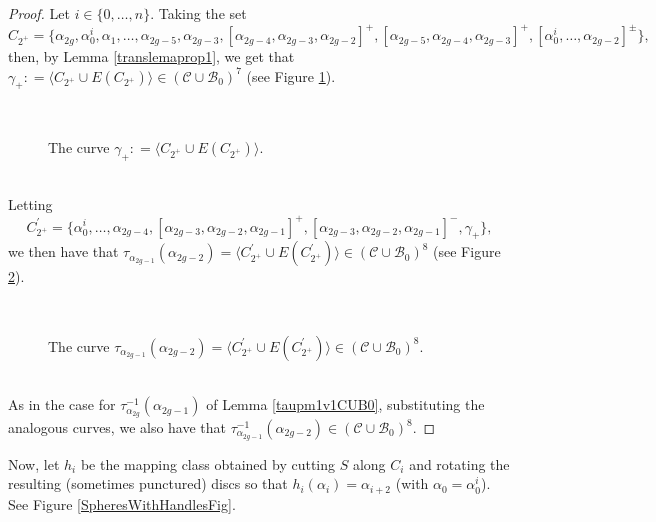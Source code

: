 \documentclass[twoside,11pt,a4paper]{article}
\newcommand*{\Cf}{\mathscr{C}}
\newcommand*{\Bf}{\mathscr{B}}
\newcommand*{\ColonEqq}{\mathrel{\mathop:}=}
\begin{document}
\begin{proof}
 \indent Let $i \in \{0, \ldots, n\}$. Taking the set $$C_{2^{+}} = \{\alpha_{2g}, \alpha_{0}^{i}, \alpha_{1}, \ldots, \alpha_{2g-5}, \alpha_{2g-3}, [\alpha_{2g-4}, \alpha_{2g-3}, \alpha_{2g-2}]^{+}, [\alpha_{2g-5},\alpha_{2g-4},\alpha_{2g-3}]^{+}, [\alpha_{0}^{i}, \ldots, \alpha_{2g-2}]^{\pm}\},$$
 then, by Lemma \ref{translemaprop1}, we get that $\gamma_{+} \ColonEqq \langle C_{2^{+}} \cup E(C_{2^{+}})\rangle \in (\Cf \cup \Bf_{0})^{7}$ (see Figure \ref{DefGammaplusBeforeRem2-11fig1}).
 \begin{figure}[h]
 \begin{center}
  \resizebox{10cm}{!}{}\\[0.3cm]
  \resizebox{10cm}{!}{} \caption{The curve $\gamma_{+} \ColonEqq \langle C_{2^{+}} \cup E(C_{2^{+}})\rangle $.} \label{DefGammaplusBeforeRem2-11fig1}
 \end{center}
 \end{figure}\\
 Letting $$C_{2^{+}}^{\prime} = \{\alpha_{0}^{i}, \ldots, \alpha_{2g-4}, [\alpha_{2g-3},\alpha_{2g-2},\alpha_{2g-1}]^{+}, [\alpha_{2g-3},\alpha_{2g-2},\alpha_{2g-1}]^{-}, \gamma_{+}\},$$ we then have that $\tau_{\alpha_{2g-1}}(\alpha_{2g-2}) = \langle C_{2^{+}}^{\prime} \cup E(C_{2^{+}}^{\prime})\rangle \in (\Cf \cup \Bf_{0})^{8}$ (see Figure \ref{DefTauofAlpha2gminus1onAlpha2gminus2}).
 \begin{figure}[h]
  \begin{center}
   \resizebox{10cm}{!}{} \\[0.3cm]
   \resizebox{10cm}{!}{} \caption{The curve $\tau_{\alpha_{2g-1}}(\alpha_{2g-2}) = \langle C_{2^{+}}^{\prime} \cup E(C_{2^{+}}^{\prime})\rangle \in (\Cf \cup \Bf_{0})^{8}$.} \label{DefTauofAlpha2gminus1onAlpha2gminus2}
  \end{center}
 \end{figure}\\
 \indent As in the case for $\tau_{\alpha_{2g}}^{-1}(\alpha_{2g-1})$ of Lemma \ref{taupm1v1CUB0}, substituting the analogous curves, we also have that $\tau_{\alpha_{2g-1}}^{-1}(\alpha_{2g-2}) \in (\Cf \cup \Bf_{0})^{8}$.
\end{proof}
\indent Now, let $h_{i}$ be the mapping class obtained by cutting $S$ along $C_{i}$ and rotating the resulting (sometimes punctured) discs so that $h_{i}(\alpha_{i}) = \alpha_{i+2}$ (with $\alpha_{0} = \alpha_{0}^{i}$). See Figure \ref{SpheresWithHandlesFig}.
\end{document}
